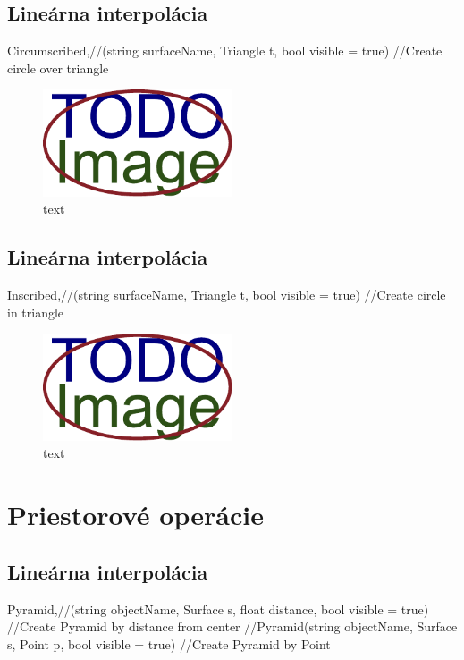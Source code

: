 \subsection{Lineárna interpolácia}
	Circumscribed,//(string surfaceName, Triangle t, bool visible = true) //Create circle over triangle

\begin{figure}[H]
	\centering
	\includegraphics[width=0.5\textwidth]{obrazky-figures/placeholder.pdf}
	\caption{text}
	\label{fig:1}
\end{figure}

\subsection{Lineárna interpolácia}
	Inscribed,//(string surfaceName, Triangle t, bool visible = true)		//Create circle in triangle

\begin{figure}[H]
	\centering
	\includegraphics[width=0.5\textwidth]{obrazky-figures/placeholder.pdf}
	\caption{text}
	\label{fig:1}
\end{figure}







\section{Priestorové operácie}


\subsection{Lineárna interpolácia}
Pyramid,//(string objectName, Surface s, float distance, bool visible = true) //Create Pyramid by distance from center
//Pyramid(string objectName, Surface s, Point p, bool visible = true) //Create Pyramid by Point

